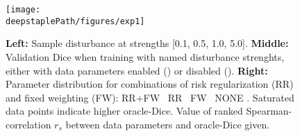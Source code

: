 

    \begin{figure}
        \centering
        \texttt{[image: \\deepstaplePath/figures/exp1]}
        \caption{\textbf{Left:} Sample disturbance  at strengths [0.1, 0.5, 1.0, 5.0]. \textbf{Middle:} Validation Dice when training with named disturbance strenghts, either with data parameters enabled (\sampleline{}) or disabled (). \textbf{Right:} Parameter distribution for combinations of risk regularization (RR) and fixed weighting (FW): RR+FW  \textpipe~RR  \textpipe~FW   \textpipe~NONE . Saturated data points indicate higher oracle-Dice. Value of ranked Spearman-correlation \(r_s\) between data parameters and oracle-Dice given.}
        \label{fig:exp1_deepstaple}
    \end{figure}

